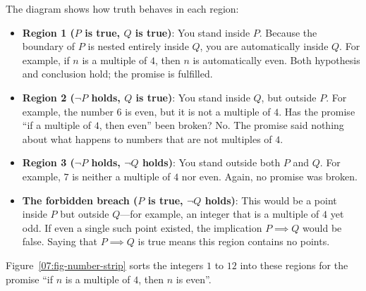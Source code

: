 The diagram shows how truth behaves in each region:
\begin{itemize}
\item \textbf{Region 1 ($P$ is true, $Q$ is true)}: You stand inside $P$. Because the boundary of $P$ is nested entirely inside $Q$, you are automatically inside $Q$. For example, if $n$ is a multiple of $4$, then $n$ is automatically even. Both hypothesis and conclusion hold; the promise is fulfilled.
\item \textbf{Region 2 ($\neg P$ holds, $Q$ is true)}: You stand inside $Q$, but outside $P$. For example, the number $6$ is even, but it is not a multiple of $4$. Has the promise ``if a multiple of $4$, then even'' been broken? No. The promise said nothing about what happens to numbers that are not multiples of $4$.
\item \textbf{Region 3 ($\neg P$ holds, $\neg Q$ holds)}: You stand outside both $P$ and $Q$. For example, $7$ is neither a multiple of $4$ nor even. Again, no promise was broken.
\item \textbf{The forbidden breach ($P$ is true, $\neg Q$ holds)}: This would be a point inside $P$ but outside $Q$---for example, an integer that is a multiple of $4$ yet odd. If even a single such point existed, the implication $P \implies Q$ would be false. Saying that $P \implies Q$ is true means this region contains no points.
\end{itemize}

Figure~\ref{07:fig-number-strip} sorts the integers $1$ to $12$ into these regions for the promise ``if $n$ is a multiple of $4$, then $n$ is even''.

